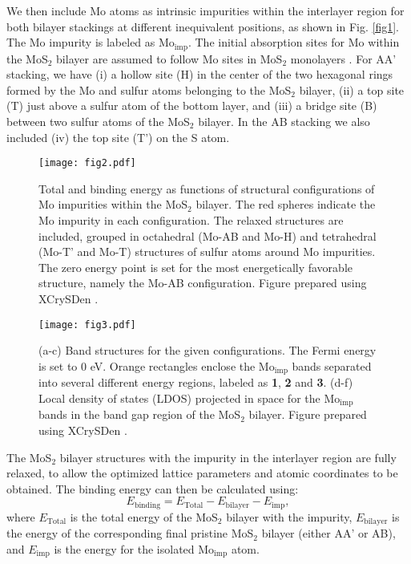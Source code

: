\documentclass[pra,twocolumn,preprintnumbers,amsmath,amssymb]{revtex4}
\begin{document}
We then include Mo atoms as intrinsic impurities within the interlayer region for both bilayer stackings at different inequivalent positions, as shown in Fig. \ref{fig1}. The Mo impurity is labeled as Mo$_\mathrm{{imp}}$. The initial absorption sites for Mo within the MoS$_{2}$ bilayer are assumed to follow Mo sites in MoS$_{2}$ monolayers \cite{komsa2015native,jinhua2017}.
For AA' stacking, we have (i) a hollow site (H) in the center of the two hexagonal rings formed by the Mo and sulfur atoms belonging to the MoS$_{2}$ bilayer, (ii) a top site (T) just above a sulfur atom of the bottom layer, and (iii) a bridge site (B) between two sulfur atoms of the MoS$_{2}$ bilayer. In the AB stacking we also included (iv) the top site (T') on the S atom.


\begin{figure*}[ht!]
\centering
\texttt{[image: fig2.pdf]}
\caption{Total and binding energy as functions of structural configurations of Mo impurities within the MoS$_2$ bilayer. The red spheres indicate the Mo impurity in each configuration. The relaxed structures are included, grouped in octahedral (Mo-AB and Mo-H) and tetrahedral (Mo-T' and Mo-T) structures of sulfur atoms around Mo impurities. The zero energy point is set for the most energetically favorable structure, namely the Mo-AB configuration. Figure prepared using XCrySDen \cite{xcrysden}.} \label{fig2}
\end{figure*}

\begin{figure*}[ht!]
\centering
\texttt{[image: fig3.pdf]}
\caption{(a-c) Band structures for the given configurations. The Fermi energy is set to 0 eV. Orange rectangles enclose the Mo$_\mathrm{imp}$ bands separated into several different energy regions, labeled as \textbf{1}, \textbf{2} and \textbf{3}. (d-f) Local density of states (LDOS) projected in space for the Mo$_\mathrm{imp}$ bands in the band gap region of the MoS$_{2}$ bilayer. Figure prepared using XCrySDen \cite{xcrysden}.} \label{fig3}
\end{figure*}

The MoS$_{2}$ bilayer structures with the impurity in the interlayer region are fully relaxed, to allow the optimized lattice parameters and atomic coordinates to be obtained. The binding energy can then be calculated using:
\begin{equation}
E_\mathrm{binding}=E_{\mathrm{Total}}-E_{\mathrm{bilayer}}-E_\mathrm{imp}\nonumber,
\end{equation}
where $E_\mathrm{{Total}}$ is the total energy of the MoS$_{2}$ bilayer with the impurity, $E_\mathrm{bilayer}$ is the energy of the corresponding final pristine MoS$_{2}$ bilayer (either AA' or AB), and $E_\mathrm{imp}$ is the energy for the isolated Mo$_\mathrm{imp}$ atom.
\end{document}
